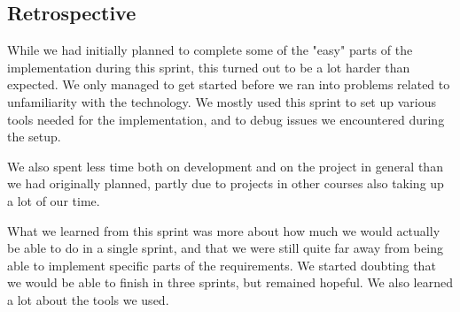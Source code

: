 \subsection{Retrospective}
While we had initially planned to complete some of the "easy" parts of the implementation during this sprint, this turned out to be a lot harder than expected. We only managed to get started before we ran into problems related to unfamiliarity with the technology. We mostly used this sprint to set up various tools needed for the implementation, and to debug issues we encountered during the setup.

We also spent less time both on development and on the project in general than we had originally planned, partly due to projects in other courses also taking up a lot of our time.

What we learned from this sprint was more about how much we would actually be able to do in a single sprint, and that we were still quite far away from being able to implement specific parts of the requirements. We started doubting that we would be able to finish in three sprints, but remained hopeful. We also learned a lot about the tools we used.
